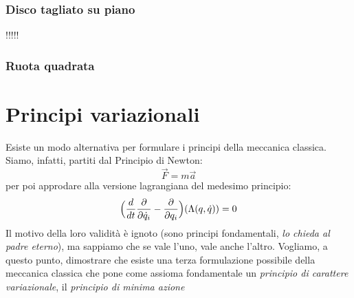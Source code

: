 \documentclass[a4paper,openany]{article}
\begin{document}
	\subsubsection{Disco tagliato su piano}
	!!!!!
	\subsubsection{Ruota quadrata}
	
	\newpage
	
	
	\section{Principi variazionali}
	Esiste un modo alternativa per formulare i principi della meccanica classica. Siamo, infatti, partiti dal Principio di Newton:
	$$\vec{F} = m\vec{a}$$
	per poi approdare alla versione lagrangiana del medesimo principio:
	\begin{equation}\label{key}
		\Bigl(\dfrac{d}{dt}\dfrac{\partial}{\partial \dot{q}_i}-\dfrac{\partial}{\partial q_i}\Bigl)(\Lambda(q,\dot{q})) = 0
	\end{equation}
	Il motivo della loro validità è ignoto (sono principi fondamentali, \textit{lo chieda al padre eterno}), ma sappiamo che se vale l'uno, vale anche l'altro. Vogliamo, a questo punto, dimostrare che esiste una terza formulazione possibile della meccanica classica che pone come assioma fondamentale un \textit{principio di carattere variazionale}, il \textit{principio di minima azione}
\end{document}
